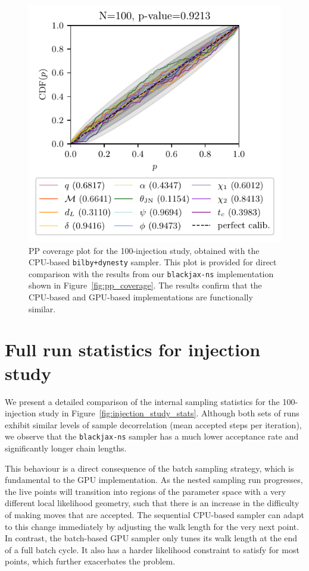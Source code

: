 \documentclass[fleqn,usenatbib]{mnras}
\begin{document}
\begin{figure}
    \centering
    \includegraphics[width=\columnwidth]{figures/pp_coverage_bilby.pdf}
    \caption{PP coverage plot for the 100-injection study, obtained
    with the CPU-based \texttt{bilby+dynesty} sampler. This plot is
    provided for direct comparison with the results from our
    \texttt{blackjax-ns} implementation shown in
    Figure~\ref{fig:pp_coverage}. The results confirm that the CPU-based
    and GPU-based implementations are functionally similar.}
    \label{fig:pp_coverage_bilby}
\end{figure}

\section{Full run statistics for injection study}
\label{app:injection_study_stats}

We present a detailed comparison of the internal sampling statistics for
the 100-injection study in Figure~\ref{fig:injection_study_stats}.
Although both sets of runs exhibit similar levels of sample decorrelation
(mean accepted steps per iteration), we observe that the \texttt{blackjax-ns} sampler
has a much lower acceptance rate and significantly longer chain lengths.    

This behaviour is a direct consequence of the batch sampling
strategy, which is fundamental to the GPU implementation. As the nested
sampling run progresses, the live points will transition into regions of
the parameter space with a very different local likelihood geometry, such that there
is an increase in the difficulty of making moves that are accepted. 
The sequential CPU-based
sampler can adapt to this change immediately by adjusting the walk
length for the very next point. In contrast, the batch-based GPU
sampler only tunes its walk length at the end of a full batch cycle.
It also has a harder likelihood constraint to satisfy for most points,
which further exacerbates the problem.
\end{document}
